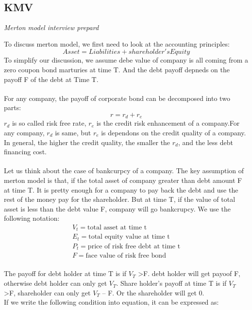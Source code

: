 \documentclass[a4paper,11pt]{article}
\begin{document}
\subsection{KMV}
\begin{centering}
\em{Merton model interview prepard}\\
\end{centering}

To discuss merton model, we first need to look at the accounting principles:
\begin{equation}
Asset=Liabilities+share holder's Equity
\end{equation}
To simplify our discussion, we assume debe value of company is all coming from a
zero coupon bond marturies at time T. And the debt payoff depneds on the payoff
F of the debt at Time T.\\\\
For any company, the payoff of corporate bond can be decomposed into two parts:
\begin{equation}
r=r_d+r_e
\end{equation}
$r_d$ is so called risk free rate, $r_e$ is the credit risk enhancement of a company.For
any company, $r_d$ is same, but $r_e$ is dependons on the credit quality of a company.
In general, the higher the credit quality, the smaller the $r_d$, and the less debt financing
cost.\\\\
Let us think about the case of bankcurpcy of a company. The key assumption of merton model
is that, if the total asset of company greater than debt amount F at time T. It is pretty
enough for a company to pay back the debt and use the rest of the money pay for the shareholder.
But at time T, if the value of total asset is less than the debt value F, company will go bankcrupcy.
We use the following notation:
\begin{equation}
\begin{array}{l}
\displaystyle V_t= \mbox {total asset at time t} \\
\displaystyle E_t= \mbox{total equity value at time t}\\
\displaystyle P_t= \mbox{price of risk free debt at time t}\\
\displaystyle F= \mbox{face value of risk free bond}\\
\end{array}
\label{eq:1}
\end{equation}

The payoff for debt holder at time T is if $V_T$ \textgreater F. debt holder will get payoof F, otherwise
debt holder can only get $V_T$.
Share holder's payoff at time T is if $V_T$ \textgreater F, shareholder can only get $V_T$ --  F. Or the
shareholder will get 0.\\
If we write the following condition into equation, it can be expressed as:\\
\end{document}
